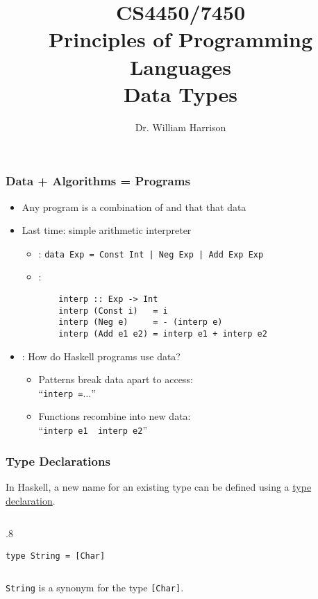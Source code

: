 \documentclass{beamer}
\title[CS4450]{CS4450/7450\\Principles of Programming Languages\\Data Types}
\author[Bill Harrison]{Dr. William Harrison}
\institute{University of Missouri}
\newenvironment{codeblock}[1][.8]{%
\begin{columns}
\begin{column}{#1\linewidth}
\begin{exampleblock}{}}{%
\end{exampleblock}
\end{column}
\end{columns}}
\def\slideskip{\vskip 0.1in}
\begin{document}
\frame{\titlepage}

\begin{frame}[fragile]
\frametitle{Data + Algorithms = Programs}
\begin{itemize}

\item Any program is a combination of {\color{red}{data structures}} and {\color{blue}{code}} that  {\color{green}{manipulates}} that data

\pause
\item Last time: simple arithmetic interpreter
	\begin{itemize}
    \item {\color{red}{data structure}}: \verb+data Exp = Const Int | Neg Exp | Add Exp Exp+
    \item {\color{blue}{code}}:
    \begin{verbatim}
    interp :: Exp -> Int
    interp (Const i)   = i
    interp (Neg e)     = - (interp e)
    interp (Add e1 e2) = interp e1 + interp e2
    \end{verbatim}
	\end{itemize}
\pause

\item {\color{green}{Manipulation}}: How do Haskell programs use data?
\begin{itemize}
\item Patterns break data apart to access: \\``{\small{\tt interp {\color{red}{(Neg e)}} =$\ldots$}}''
\item Functions recombine into new data: \\``{\small{\tt interp e1 {\bf{\color{red}{+}}} interp e2}}''
\end{itemize}

\end{itemize}
\end{frame}


\begin{frame}[fragile]
\Large

\frametitle{Type Declarations}

In Haskell, a new name for an existing type can be 
defined using a \underline{type declaration}. 

\slideskip

\begin{codeblock}
\begin{verbatim}
type String = [Char] 
\end{verbatim}
\end{codeblock}

\slideskip

{\tt String} is a synonym for the type \verb+[Char]+.
\end{frame}
\end{document}
